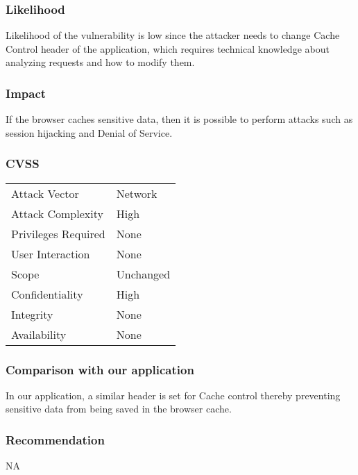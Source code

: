 \subsubsection{Likelihood}
Likelihood of the vulnerability is low since the attacker needs to change Cache Control header of the application, which requires technical knowledge about analyzing requests and how to modify them.

\subsubsection{Impact}
If the browser caches sensitive data, then it is possible to perform attacks such as session hijacking and Denial of Service.

\subsubsection{CVSS}
\begin{tabular}{l | l}
Attack Vector		& Network \\
Attack Complexity	& High \\
Privileges Required & None \\
User Interaction	& None \\
Scope				& Unchanged \\
Confidentiality		& High \\
Integrity			& None \\
Availability		& None
\end{tabular}

\subsubsection{Comparison with our application}
In our application, a similar header is set for Cache control thereby preventing sensitive data from being saved in the browser cache.

\subsubsection{Recommendation}
NA
\clearpage